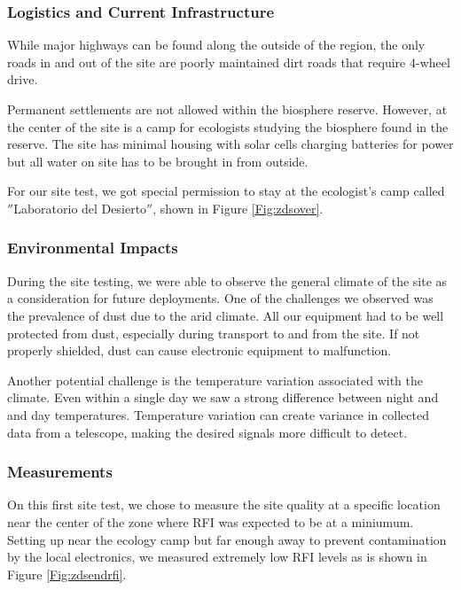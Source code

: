 \subsubsection{Logistics and Current Infrastructure}

While major highways can be found along the outside of the region, the only roads in and out of the site are poorly maintained dirt roads that require 4-wheel drive.

Permanent settlements are not allowed within the biosphere reserve. However, at the center of the site is a camp for ecologists studying the biosphere found in the reserve. The site has minimal housing with solar cells charging batteries for power but all water on site has to be brought in from outside. 

For our site test, we got special permission to stay at the ecologist's camp called $''$Laboratorio del Desierto$''$, shown in Figure \ref{Fig:zdsover}.

\subsubsection{Environmental Impacts}

During the site testing, we were able to observe the general climate of the site as a consideration for future deployments. One of the challenges we observed was the prevalence of dust due to the arid climate. All our equipment had to be well protected from dust, especially during transport to and from the site. If not properly shielded, dust can cause electronic equipment to malfunction. 

Another potential challenge is the temperature variation associated with the climate. Even within a single day we saw a strong difference between night and and day temperatures. Temperature variation can create variance in collected data from a telescope, making the desired signals more difficult to detect. 

\subsubsection{Measurements}

On this first site test, we chose to measure the site quality at a specific location near the center of the zone where RFI was expected to be at a miniumum. Setting up near the ecology camp but far enough away to prevent contamination by the local electronics, we measured extremely low RFI levels as is shown in Figure \ref{Fig:zdsendrfi}.

